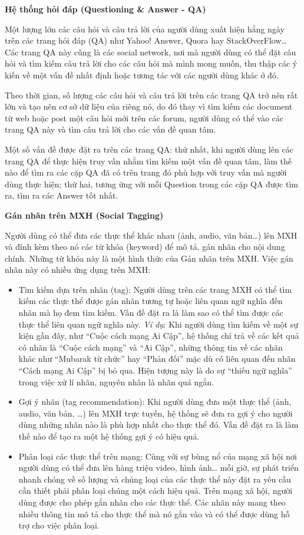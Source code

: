 \documentclass[12pt]{extarticle}
\begin{document}
			\par \textbf{Hệ thống hỏi đáp (Questioning \& Answer - QA)}
			\par Một lượng lớn các câu hỏi và câu trả lời của người dùng xuất hiện hằng ngày trên các trang hỏi đáp (QA) như Yahoo! Answer, Quora hay StackOverFlow… Các trang QA này cũng là các social network, nơi mà người dùng có thể đặt câu hỏi và tìm kiếm câu trả lời cho các câu hỏi mà mình mong muốn, thu thập các ý kiến về một vấn đề nhất định hoặc tương tác với các người dùng khác ở đó. 
			\par Theo thời gian, số lượng các câu hỏi và câu trả lời trên các trang QA trở nên rất lớn và tạo nên cơ sở dữ liệu của riêng nó, do đó thay vì tìm kiếm các document từ web hoặc post một câu hỏi mới trên các forum, người dùng có thể vào các trang QA này và tìm câu trả lời cho các vấn đề quan tâm.
			\par Một số vấn đề được đặt ra trên các trang QA: thứ nhất, khi người dùng lên các trang QA để thực hiện truy vấn nhằm tìm kiếm một vấn đề quan tâm, làm thế nào để tìm ra các cặp QA đã có trên trang đó phù hợp với truy vấn mà người dùng thực hiện; thứ hai, tương ứng với mỗi Question trong các cặp QA được tìm ra, tìm ra các Answer tốt nhất.
			\par \textbf{Gán nhãn trên MXH (Social Tagging)}
			\par Người dùng có thể đưa các thực thể khác nhau (ảnh, audio, văn bản…) lên MXH và đính kèm theo nó các từ khóa (keyword) để mô tả, gán nhãn cho nội dung chính. Những từ khóa này là một hình thức của Gán nhãn trên MXH. Việc gán nhãn này có nhiều ứng dụng trên MXH:
			\begin{itemize}
				\item Tìm kiếm dựa trên nhãn (tag): Người dùng trên các trang MXH có thể tìm kiếm các thực thể được gán nhãn tương tự hoặc liên quan ngữ nghĩa đến nhãn mà họ đem tìm kiếm. Vấn đề đặt ra là làm sao có thể tìm được các thực thể liên quan ngữ nghĩa này. \textit{Ví dụ}: Khi người dùng tìm kiếm về một sự kiện gần đây, như “Cuộc cách mạng  Ai Cập”, hệ thống chỉ trả về các kết quả có nhãn là “Cuộc cách mạng” và “Ai Cập”, những thông tin về các nhãn khác như “Mubarak từ chức” hay “Phản đối” mặc dù có liên quan đến nhãn “Cách mạng Ai Cập” bị bỏ qua. Hiện tượng này là do sự “thiếu ngữ nghĩa” trong việc xử lí nhãn, nguyên nhân là nhãn quá ngắn.
				\item Gợi ý nhãn (tag recommendation): Khi người dùng đưa một thực thể (ảnh, audio, văn bản, …) lên MXH trực tuyến, hệ thống sẽ đưa ra gợi ý cho người dùng những nhãn nào là phù hợp nhất cho thực thể đó. Vấn đề đặt ra là làm thế nào để tạo ra một hệ thống gợi ý có hiệu quả.   
				\item Phân loại các thực thể trên mạng: Cùng với sự bùng nổ của mạng xã hội nơi người dùng có thể đưa lên hàng triệu video, hình ảnh… mỗi giờ, sự phát triển nhanh chóng về số lượng và chủng loại của các thực thể này đặt ra yêu cầu cần thiết phải phân loại chúng một cách hiệu quả. Trên mạng xã hội, người dùng được cho phép gắn nhãn cho các thực thể. Các nhãn này mang theo nhiều thông tin mô tả cho thực thể mà nó gắn vào và có thể được dùng hỗ trợ cho việc phân loại.
			\end{itemize}
\end{document}
